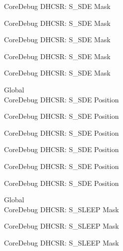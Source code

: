 \begin{DoxyRefList}
\label{deprecated__deprecated000471}%
%
Core\+Debug DHCSR\+: S\+\_\+\+SDE Mask 

\label{deprecated__deprecated000573}%
%
Core\+Debug DHCSR\+: S\+\_\+\+SDE Mask 

\label{deprecated__deprecated000698}%
%
Core\+Debug DHCSR\+: S\+\_\+\+SDE Mask 

\label{deprecated__deprecated001149}%
%
Core\+Debug DHCSR\+: S\+\_\+\+SDE Mask 

\label{deprecated__deprecated001251}%
%
Core\+Debug DHCSR\+: S\+\_\+\+SDE Mask  
\item[Global \doxylink{group___c_m_s_i_s___s_c_b_ga34b00f5a0109d236647be6609d6f04b3}{Core\+Debug\+\_\+\+DHCSR\+\_\+\+S\+\_\+\+SDE\+\_\+\+Pos} ]\hfill \\
\label{deprecated__deprecated000019}%
%
Core\+Debug DHCSR\+: S\+\_\+\+SDE Position 

\label{deprecated__deprecated000470}%
%
Core\+Debug DHCSR\+: S\+\_\+\+SDE Position 

\label{deprecated__deprecated000572}%
%
Core\+Debug DHCSR\+: S\+\_\+\+SDE Position 

\label{deprecated__deprecated000697}%
%
Core\+Debug DHCSR\+: S\+\_\+\+SDE Position 

\label{deprecated__deprecated001148}%
%
Core\+Debug DHCSR\+: S\+\_\+\+SDE Position 

\label{deprecated__deprecated001250}%
%
Core\+Debug DHCSR\+: S\+\_\+\+SDE Position  
\item[Global \doxylink{group___c_m_s_i_s___core_debug_ga98d51538e645c2c1a422279cd85a0a25}{Core\+Debug\+\_\+\+DHCSR\+\_\+\+S\+\_\+\+SLEEP\+\_\+\+Msk} ]\hfill \\
\label{deprecated__deprecated000024}%
%
Core\+Debug DHCSR\+: S\+\_\+\+SLEEP Mask 

\label{deprecated__deprecated000116}%
%
Core\+Debug DHCSR\+: S\+\_\+\+SLEEP Mask 

\label{deprecated__deprecated000170}%
%
Core\+Debug DHCSR\+: S\+\_\+\+SLEEP Mask 


\end{DoxyRefList}
